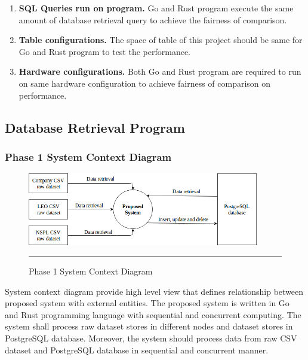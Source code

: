 \begin{enumerate}[topsep=0pt,itemsep=-1ex,partopsep=1ex,parsep=1.5ex]
	
	\item \textbf{SQL Queries run on program. } Go and Rust program execute the same amount of database retrieval query to achieve the fairness of comparison.
	\newline
	\item \textbf{Table configurations.} The space of table of this project should be same for Go and Rust program to test the performance. 
	\newline
	\item \textbf{Hardware configurations. } Both Go and Rust program are required to run on same hardware configuration to achieve fairness of comparison on performance.
	\newline
	
\end{enumerate}

\pagebreak

\subsection{Database Retrieval Program}

\subsubsection{Phase 1 System Context Diagram}

\begin{figure}[H]
	\centering
	\includegraphics[width=0.9\textwidth]{Figure/fyp-context.png}
	\rule{35em}{0.5pt}
	\caption[Phase 1 System Context Diagram]{Phase 1 System Context Diagram}
\end{figure}

System context diagram provide high level view that defines relationship between proposed system with external entities. The proposed system is written in Go and Rust programming language with sequential and concurrent computing. The system shall process raw dataset stores in different nodes and dataset stores in PostgreSQL database. Moreover, the system should process data from raw CSV dataset and PostgreSQL database in sequential and concurrent manner. 

